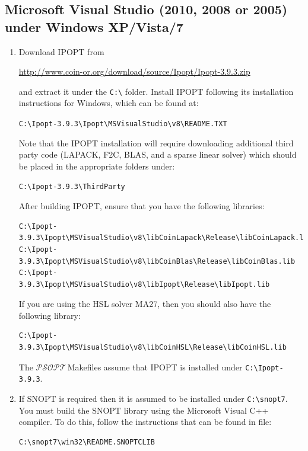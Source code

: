 \documentclass[a4paper,11pt]{report}    %
\newcommand{\psopt}{$\mathcal{PSOPT}$\,}  %
\begin{document}
\subsection{Microsoft Visual Studio (2010, 2008 or 2005) under Windows XP/Vista/7}


\begin{enumerate}
\item Download IPOPT from

\small
\href{http://www.coin-or.org/download/source/Ipopt/Ipopt-3.9.3.zip}{http://www.coin-or.org/download/source/Ipopt/Ipopt-3.9.3.zip}
\normalsize

\noindent and extract it under the \verb|C:\| folder. Install 
IPOPT following its installation instructions for Windows, which
can be found at:

\verb|C:\Ipopt-3.9.3\Ipopt\MSVisualStudio\v8\README.TXT|

Note that the IPOPT installation will require downloading additional third party
code (LAPACK, F2C, BLAS, and a sparse linear solver) which should be placed in
the appropriate folders under:

\verb|C:\Ipopt-3.9.3\ThirdParty|

After building IPOPT, ensure that you have the following libraries:
\scriptsize
\begin{verbatim}
C:\Ipopt-3.9.3\Ipopt\MSVisualStudio\v8\libCoinLapack\Release\libCoinLapack.lib
C:\Ipopt-3.9.3\Ipopt\MSVisualStudio\v8\libCoinBlas\Release\libCoinBlas.lib
C:\Ipopt-3.9.3\Ipopt\MSVisualStudio\v8\libIpopt\Release\libIpopt.lib
\end{verbatim}
\normalsize

If you are using the HSL solver MA27, then you should also have the following
library:
\scriptsize
\begin{verbatim}
C:\Ipopt-3.9.3\Ipopt\MSVisualStudio\v8\libCoinHSL\Release\libCoinHSL.lib
\end{verbatim}
\normalsize

\noindent The \psopt Makefiles assume that IPOPT is installed under \verb|C:\Ipopt-3.9.3|. 

\item If SNOPT is required then it is assumed  to be installed under
\verb|C:\snopt7|. You must build the SNOPT library using the Microsoft Visual C++ compiler. To 
do this, follow the instructions that can be found in file:

\begin{verbatim}
C:\snopt7\win32\README.SNOPTCLIB
\end{verbatim}


\end{enumerate}
\end{document}
